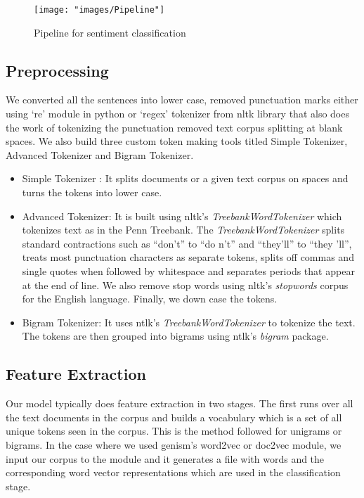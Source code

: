 \documentclass[a4paper,26pt]{article}
\begin{document}
\begin{figure}[h]
\centerline{\texttt{[image: "images/Pipeline"]}
}
\caption{Pipeline for sentiment classification}
 \label{fig:pipeline}
\end{figure}

\subsection{Preprocessing}
We converted all the sentences into lower case, removed punctuation marks either using `re' module in python or `regex' tokenizer from nltk library that also does the work of tokenizing the punctuation removed text corpus splitting at blank spaces. We also build three custom token making tools titled Simple Tokenizer, Advanced Tokenizer and Bigram Tokenizer. 

\begin{itemize}
    \item Simple Tokenizer : It splits documents or a given text corpus on spaces and  turns the tokens into lower case.
    \item Advanced Tokenizer: It is built using nltk's \textit{TreebankWordTokenizer} which tokenizes text as in the Penn Treebank. The \textit{TreebankWordTokenizer} splits standard contractions such as ``don't'' to ``do n't'' and ``they'll'' to ``they 'll'', treats most punctuation characters as separate tokens, splits off commas and single quotes when followed by whitespace and separates periods that appear at the end of line. We also remove stop words using nltk's \textit{stopwords} corpus for the English language. Finally, we down case the tokens. 
    \item Bigram Tokenizer: It uses ntlk's \textit{TreebankWordTokenizer} to tokenize the text. The tokens are then grouped into bigrams using ntlk's \textit{bigram} package.
\end{itemize}

\subsection{Feature Extraction}
Our model typically does feature extraction in two stages. The first runs over all the text documents in the corpus and builds a vocabulary which is a set of all unique tokens seen in the corpus. This is the method followed for unigrams or bigrams. In the case where we used genism's word2vec or doc2vec module, we input our corpus to the module and it generates a file with words and the corresponding word vector representations which are used in the classification stage. 
\end{document}
